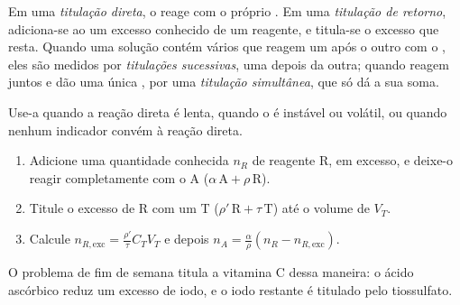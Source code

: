 \begin{definition}\label{def:b1:titration-methods:kinds}
Em uma \emph{titulação direta}, o  reage
com o próprio . Em uma \emph{titulação de retorno},
adiciona-se ao  um excesso conhecido de um reagente, e titula-se
o excesso que resta. Quando uma solução contém vários  que
reagem um após o outro com o , eles são medidos por
\emph{titulações sucessivas}, uma 
depois da outra; quando reagem juntos e dão uma única ,
por uma \emph{titulação simultânea}, que só dá
a sua soma.
\end{definition}

\begin{method}\label{met:b1:titration-methods:back-titration}
Use-a quando a reação direta é lenta, quando o  é instável ou
volátil, ou quando nenhum indicador convém à reação direta.
\begin{enumerate}
  \item Adicione uma quantidade conhecida $n_R$ de reagente R, em
        excesso, e deixe-o reagir completamente com o  A
        ($\alpha\,\mathrm{A} + \rho\,\mathrm{R}$).
  \item Titule o excesso de R com um  T ($\rho'\,\mathrm{R} +
        \tau\,\mathrm{T}$) até o volume de  $V_T$.
  \item Calcule $n_{R,\text{exc}} = \frac{\rho'}{\tau}C_TV_T$ e depois
        $n_A = \frac{\alpha}{\rho}(n_R - n_{R,\text{exc}})$.
\end{enumerate}
\end{method}

O problema de fim de semana titula a vitamina C dessa maneira: o ácido
ascórbico reduz um excesso de iodo, e o iodo restante é titulado pelo
tiossulfato.

